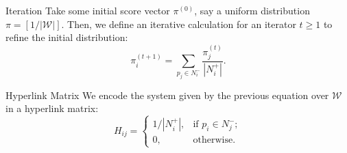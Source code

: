\documentclass{beamer}
\newcommand{\iter}[2]{#1^{(#2)}}
\newcommand{\iter}[2]{#1^{(#2)}}
\begin{document}
\begin{frame}{Iteration}
     Take some initial score vector $\iter{\pi}{0}$, say a uniform distribution $\pi = [1/|\mathcal{W}|]$. Then, we define an iterative calculation for an iterator $t\geq 1$ to refine the initial distribution:
 	 \begin{equation*}
	 	\iter{\pi}{t+1}_i = \sum_{p_j\in N^-_i}{\frac{\iter{\pi}{t}_j}{|N^+_i|}}.
 	\end{equation*}
\end{frame}

\begin{frame}{Hyperlink Matrix}
     We encode the system given by the previous equation over $\mathcal{W}$ in a hyperlink matrix:
 	\begin{equation*}
 		H_{ij}=\begin{cases}
 			1/|N^+_i|, & \text{if } p_i \in N^-_j; \\
 			0, & \text{otherwise}.
 		\end{cases}
 	\end{equation*}
\end{frame}

\end{document}
